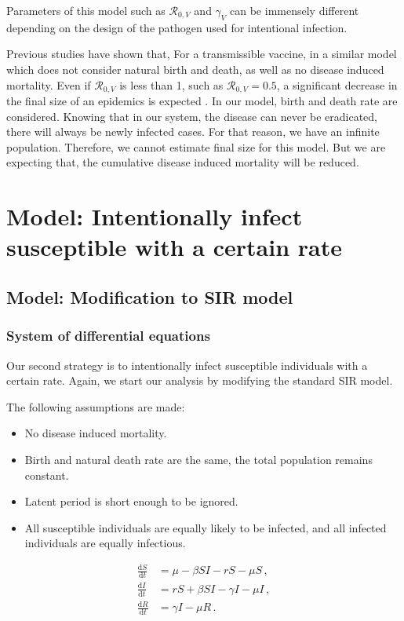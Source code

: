 \documentclass[12pt]{article}
\newcommand\dbyd[2]{\frac{\mathrm d{#1}}{\mathrm d{#2}}}
\newcommand{\R}{\mathcal{R}}
\begin{document}
Parameters of this model such as $\R_{0,V}$ and $\gamma_V$ can be immensely different depending on the design of the pathogen used for intentional infection. 

Previous studies have shown that, For a transmissible vaccine, in a similar model which does not consider natural birth and death, as well as no disease induced mortality. Even if $\R_{0,V}$ is less than 1, such as $\R_{0,V}=0.5$, a significant decrease in the final size of an epidemics is expected \cite{nuismer2018controlling}. In our model, birth and death rate are considered. Knowing that in our system, the disease can never be eradicated, there will always be newly infected cases. For that reason, we have an infinite population. Therefore, we cannot estimate final size for this model. But we are expecting that, the cumulative disease induced mortality will be reduced.

\section{Model: Intentionally infect susceptible with a certain rate}
\subsection{Model: Modification to SIR model}
\subsubsection{System of differential equations}
Our second strategy is to intentionally infect susceptible individuals with a certain rate. Again, we start our analysis by modifying the standard SIR model.

The following assumptions are made:
\begin{itemize}
\item No disease induced mortality.
\item Birth and natural death rate are the same, the total population remains constant.
\item Latent period is short enough to be ignored.
\item All susceptible individuals are equally likely to be infected, and all infected individuals are equally infectious.
\end{itemize}

\begin{linenomath*}
\begin{equation}\label{model:susceptible}
\begin{split}
\dbyd{S}{t}&=\mu- \beta SI-rS-\mu S\,, \\
\dbyd{I}{t}&=rS+\beta SI-\gamma I -\mu I\,,\\
\dbyd{R}{t}&=\gamma I-\mu R\,.
\end{split}
\end{equation}
\end{linenomath*}
\end{document}
